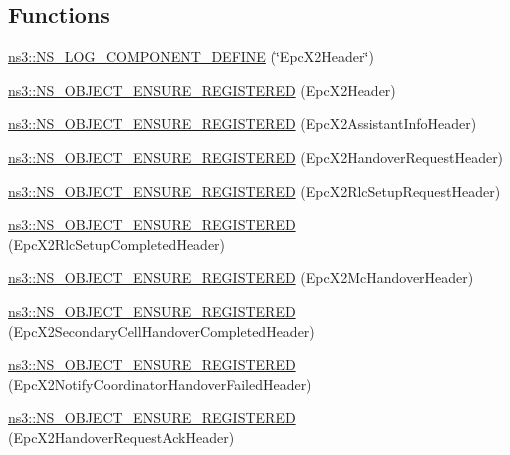 \subsection*{Functions}
\begin{DoxyCompactItemize}
\item 
\hyperlink{namespacens3_a345331dd95699a2358145838c41e882d}{ns3\+::\+N\+S\+\_\+\+L\+O\+G\+\_\+\+C\+O\+M\+P\+O\+N\+E\+N\+T\+\_\+\+D\+E\+F\+I\+NE} (\char`\"{}Epc\+X2\+Header\char`\"{})
\item 
\hyperlink{namespacens3_a4db5aeb503fe23f61ce79f11f0d3be9e}{ns3\+::\+N\+S\+\_\+\+O\+B\+J\+E\+C\+T\+\_\+\+E\+N\+S\+U\+R\+E\+\_\+\+R\+E\+G\+I\+S\+T\+E\+R\+ED} (Epc\+X2\+Header)
\item 
\hyperlink{namespacens3_ab677ab62dc586ba8ec6978ab2c97de05}{ns3\+::\+N\+S\+\_\+\+O\+B\+J\+E\+C\+T\+\_\+\+E\+N\+S\+U\+R\+E\+\_\+\+R\+E\+G\+I\+S\+T\+E\+R\+ED} (Epc\+X2\+Assistant\+Info\+Header)
\item 
\hyperlink{namespacens3_a427b80f00132def7ea64cdd7b28a17e3}{ns3\+::\+N\+S\+\_\+\+O\+B\+J\+E\+C\+T\+\_\+\+E\+N\+S\+U\+R\+E\+\_\+\+R\+E\+G\+I\+S\+T\+E\+R\+ED} (Epc\+X2\+Handover\+Request\+Header)
\item 
\hyperlink{namespacens3_ad45050e48998be172931a423f3ba979f}{ns3\+::\+N\+S\+\_\+\+O\+B\+J\+E\+C\+T\+\_\+\+E\+N\+S\+U\+R\+E\+\_\+\+R\+E\+G\+I\+S\+T\+E\+R\+ED} (Epc\+X2\+Rlc\+Setup\+Request\+Header)
\item 
\hyperlink{namespacens3_a530766069343cd0d3a0d6a8b1650318b}{ns3\+::\+N\+S\+\_\+\+O\+B\+J\+E\+C\+T\+\_\+\+E\+N\+S\+U\+R\+E\+\_\+\+R\+E\+G\+I\+S\+T\+E\+R\+ED} (Epc\+X2\+Rlc\+Setup\+Completed\+Header)
\item 
\hyperlink{namespacens3_a2bd1484f4773d700bffaa4fb3d3a40eb}{ns3\+::\+N\+S\+\_\+\+O\+B\+J\+E\+C\+T\+\_\+\+E\+N\+S\+U\+R\+E\+\_\+\+R\+E\+G\+I\+S\+T\+E\+R\+ED} (Epc\+X2\+Mc\+Handover\+Header)
\item 
\hyperlink{namespacens3_ae45198a7b7b23da657ffad54cb4dd11c}{ns3\+::\+N\+S\+\_\+\+O\+B\+J\+E\+C\+T\+\_\+\+E\+N\+S\+U\+R\+E\+\_\+\+R\+E\+G\+I\+S\+T\+E\+R\+ED} (Epc\+X2\+Secondary\+Cell\+Handover\+Completed\+Header)
\item 
\hyperlink{namespacens3_a89eab361de47075dd9eccd2d40fee611}{ns3\+::\+N\+S\+\_\+\+O\+B\+J\+E\+C\+T\+\_\+\+E\+N\+S\+U\+R\+E\+\_\+\+R\+E\+G\+I\+S\+T\+E\+R\+ED} (Epc\+X2\+Notify\+Coordinator\+Handover\+Failed\+Header)
\item 
\hyperlink{namespacens3_aecea2ae778f1c1ce8e28d943dd4c1b9b}{ns3\+::\+N\+S\+\_\+\+O\+B\+J\+E\+C\+T\+\_\+\+E\+N\+S\+U\+R\+E\+\_\+\+R\+E\+G\+I\+S\+T\+E\+R\+ED} (Epc\+X2\+Handover\+Request\+Ack\+Header)

\end{DoxyCompactItemize}
